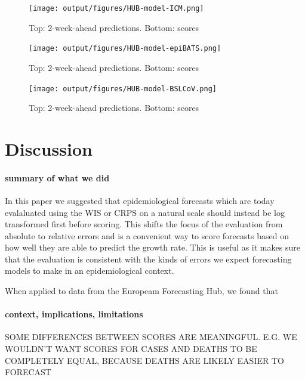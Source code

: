 \documentclass{article}
\begin{document}






\begin{figure}[h!]
    \centering
    \texttt{[image: output/figures/HUB-model-ICM.png]}
    \caption{Top: 2-week-ahead predictions. Bottom: scores }
    \label{fig:HUB-model-ICM}
\end{figure}


\begin{figure}[h!]
    \centering
    \texttt{[image: output/figures/HUB-model-epiBATS.png]}
    \caption{Top: 2-week-ahead predictions. Bottom: scores }
    \label{fig:HUB-model-epiBATS}
\end{figure}


\begin{figure}[h!]
    \centering
    \texttt{[image: output/figures/HUB-model-BSLCoV.png]}
    \caption{Top: 2-week-ahead predictions. Bottom: scores }
    \label{fig:HUB-model-BSLCoV}
\end{figure}



\section{Discussion}

\paragraph{summary of what we did}
In this paper we suggested that epidemiological forecasts which are today evalaluated using the WIS or CRPS on a natural scale should instead be log transformed first before scoring. This shifts the focus of the evaluation from absolute to relative errors and is a convenient way to score forecasts based on how well they are able to predict the growth rate. This is useful as it makes sure that the evaluation is consistent with the kinds of errors we expect forecasting models to make in an epidemiological context. 

When applied to data from the Europeam Forecasting Hub, we found that 

\paragraph{context, implications, limitations}

SOME DIFFERENCES BETWEEN SCORES ARE MEANINGFUL. E.G. WE WOULDN'T WANT SCORES FOR CASES AND DEATHS TO BE COMPLETELY EQUAL, BECAUSE DEATHS ARE LIKELY EASIER TO FORECAST
\end{document}

